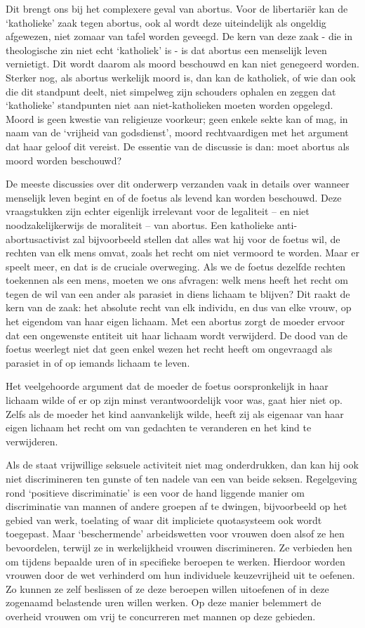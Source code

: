 \documentclass[
  a5paper,
  smalldemyvopaper,10pt,twoside,onecolumn,openright,extrafontsizes,hidelinks]{memoir}
\begin{document}
Dit brengt ons bij het complexere geval van abortus. Voor de libertariër
kan de `katholieke' zaak tegen abortus, ook al wordt deze uiteindelijk
als ongeldig afgewezen, niet zomaar van tafel worden geveegd. De kern
van deze zaak - die in theologische zin niet echt `katholiek' is - is
dat abortus een menselijk leven vernietigt. Dit wordt daarom als moord
beschouwd en kan niet genegeerd worden. Sterker nog, als abortus
werkelijk moord is, dan kan de katholiek, of wie dan ook die dit
standpunt deelt, niet simpelweg zijn schouders ophalen en zeggen dat
`katholieke' standpunten niet aan niet-katholieken moeten worden
opgelegd. Moord is geen kwestie van religieuze voorkeur; geen enkele
sekte kan of mag, in naam van de `vrijheid van godsdienst', moord
rechtvaardigen met het argument dat haar geloof dit vereist. De essentie
van de discussie is dan: moet abortus als moord worden beschouwd?

De meeste discussies over dit onderwerp verzanden vaak in details over
wanneer menselijk leven begint en of de foetus als levend kan worden
beschouwd. Deze vraagstukken zijn echter eigenlijk irrelevant voor de
legaliteit -- en niet noodzakelijkerwijs de moraliteit -- van abortus.
Een katholieke anti-abortusactivist zal bijvoorbeeld stellen dat alles
wat hij voor de foetus wil, de rechten van elk mens omvat, zoals het
recht om niet vermoord te worden. Maar er speelt meer, en dat is de
cruciale overweging. Als we de foetus dezelfde rechten toekennen als een
mens, moeten we ons afvragen: welk mens heeft het recht om tegen de wil
van een ander als parasiet in diens lichaam te blijven? Dit raakt de
kern van de zaak: het absolute recht van elk individu, en dus van elke
vrouw, op het eigendom van haar eigen lichaam. Met een abortus zorgt de
moeder ervoor dat een ongewenste entiteit uit haar lichaam wordt
verwijderd. De dood van de foetus weerlegt niet dat geen enkel wezen het
recht heeft om ongevraagd als parasiet in of op iemands lichaam te
leven.

Het veelgehoorde argument dat de moeder de foetus oorspronkelijk in haar
lichaam wilde of er op zijn minst verantwoordelijk voor was, gaat hier
niet op. Zelfs als de moeder het kind aanvankelijk wilde, heeft zij als
eigenaar van haar eigen lichaam het recht om van gedachten te veranderen
en het kind te verwijderen.

Als de staat vrijwillige seksuele activiteit niet mag onderdrukken, dan
kan hij ook niet discrimineren ten gunste of ten nadele van een van
beide seksen. Regelgeving rond `positieve discriminatie' is een voor de
hand liggende manier om discriminatie van mannen of andere groepen af te
dwingen, bijvoorbeeld op het gebied van werk, toelating of waar dit
impliciete quotasysteem ook wordt toegepast. Maar `beschermende'
arbeidswetten voor vrouwen doen alsof ze hen bevoordelen, terwijl ze in
werkelijkheid vrouwen discrimineren. Ze verbieden hen om tijdens
bepaalde uren of in specifieke beroepen te werken. Hierdoor worden
vrouwen door de wet verhinderd om hun individuele keuzevrijheid uit te
oefenen. Zo kunnen ze zelf beslissen of ze deze beroepen willen
uitoefenen of in deze zogenaamd belastende uren willen werken. Op deze
manier belemmert de overheid vrouwen om vrij te concurreren met mannen
op deze gebieden.
\end{document}
